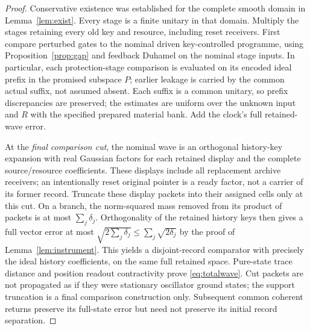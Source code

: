 \documentclass[11pt]{article}
\theoremstyle{definition}\newtheorem{assumption}[theorem]{Constitutive assumption}
\theoremstyle{remark}\newtheorem{remark}[theorem]{Remark}
\begin{document}
\begin{proof}
Conservative existence was established for the complete smooth domain in Lemma~\ref{lem:exist}. Every stage is a finite unitary in that domain. Multiply the stages retaining every old key and resource, including reset receivers. First compare perturbed gates to the nominal driven key-controlled programme, using Proposition~\ref{prop:gap} and feedback Duhamel on the nominal stage inputs. In particular, each protection-stage comparison is evaluated on its encoded ideal prefix in the promised subspace $P$; earlier leakage is carried by the common actual suffix, not assumed absent. Each suffix is a common unitary, so prefix discrepancies are preserved; the estimates are uniform over the unknown input and $R$ with the specified prepared material bank. Add the clock's full retained-wave error.

At the \emph{final comparison cut}, the nominal wave is an orthogonal history-key expansion with real Gaussian factors for each retained display and the complete source/resource coefficients. These displays include all replacement archive receivers; an intentionally reset original pointer is a ready factor, not a carrier of its former record. Truncate these display packets into their assigned cells only at this cut. On a branch, the norm-squared mass removed from its product of packets is at most $\sum_j\delta_j$. Orthogonality of the retained history keys then gives a full vector error at most $\sqrt{2\sum_j\delta_j}\le\sum_j\sqrt{2\delta_j}$ by the proof of Lemma~\ref{lem:instrument}. This yields a disjoint-record comparator with precisely the ideal history coefficients, on the same full retained space. Pure-state trace distance and position readout contractivity prove \eqref{eq:totalwave}. Cut packets are not propagated as if they were stationary oscillator ground states; the support truncation is a final comparison construction only. Subsequent common coherent returns preserve its full-state error but need not preserve its initial record separation.


\end{proof}
\end{document}
